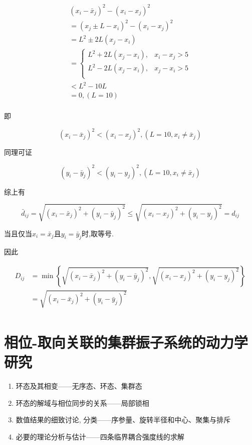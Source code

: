 \documentclass{article}
\begin{document}
$$
\begin{array}{l}
	(x_i-\bar{x}_j)^2-(x_i-x_j)^2\\
	=\left( x_j\pm L-x_i \right) ^2-(x_i-x_j)^2\\
	=L^2\pm 2L\left( x_j-x_i \right)\\
	=\left\{ \begin{matrix}
	L^2+2L\left( x_j-x_i \right) ,&		x_i-x_j>5\\
	L^2-2L\left( x_j-x_i \right) ,&		x_j-x_i>5\\
\end{matrix} \right.\\
	<L^2-10L\\
	=0, \left( L=10 \right)\\
\end{array}
$$

即

$$
(x_i-\bar{x}_j)^2<(x_i-x_j)^2, \left( L=10, x_i\ne \bar{x}_j \right)
$$

同理可证

$$
(y_i-\bar{y}_j)^2<(y_i-y_j)^2, \left( L=10, x_i\ne \bar{x}_j \right)
$$

综上有

$$
\bar{d}_{ij}=\sqrt{(x_i-\bar{x}_j)^2+(y_i-\bar{y}_j)^2}\le \sqrt{(x_i-x_j)^2+(y_i-y_j)^2}=d_{ij}
$$

当且仅当$x_i=\bar{x}_j$且$y_i=\bar{y}_j$时,取等号.

因此

$$
\begin{aligned}
	D_{ij}&=\min \left\{ \sqrt{(x_i-\bar{x}_j)^2+(y_i-\bar{y}_j)^2},\sqrt{(x_i-x_j)^2+(y_i-y_j)^2} \right\}\\
	&=\sqrt{(x_i-\bar{x}_j)^2+(y_i-\bar{y}_j)^2}\\
\end{aligned}
$$

\newpage

\section{相位-取向关联的集群振子系统的动力学研究}

\begin{enumerate}
    \item 环态及其相变——无序态、环态、集群态
    \item 环态的解域与相位同步的关系——局部锁相
    \item 数值结果的细致讨论, 分类——序参量、旋转半径和中心、聚集与排斥
    \item 必要的理论分析与估计——四条临界耦合强度线的求解
\end{enumerate}
\end{document}
